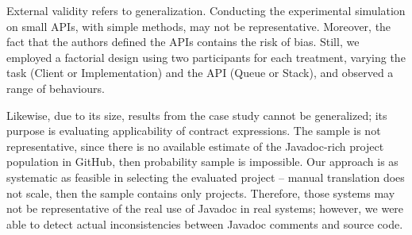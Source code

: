 External validity refers to generalization. 
Conducting the experimental simulation on small APIs, with simple methods, may not be representative. Moreover, the fact that the authors defined the APIs contains the risk of bias. Still, we employed a factorial design using two participants for each treatment, varying the task (Client or Implementation) and the API (Queue or Stack), and observed a range of behaviours. 

Likewise, due to its size, results from the case study cannot be generalized; its purpose is evaluating applicability of contract expressions.
The sample is not representative, since there is no available estimate of the Javadoc-rich project
population in GitHub, then probability sample is impossible. 
Our approach is as systematic as feasible in selecting the evaluated project -- manual translation
does not scale, then the sample contains only \totalSystems{} projects.
Therefore, those systems may not be representative of the real use of Javadoc in real systems; however, we were able to detect actual inconsistencies between Javadoc comments and source code.



